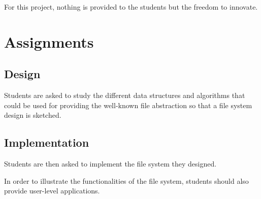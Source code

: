 For this project, nothing is provided to the students but the freedom to
innovate.

%
%

\section{Assignments}


\subsection*{Design}

Students are asked to study the different data structures and algorithms
that could be used for providing the well-known file abstraction so that
a file system design is sketched.


\subsection*{Implementation}

Students are then asked to implement the file system they designed.

In order to illustrate the functionalities of the file system, students
should also provide user-level applications.
